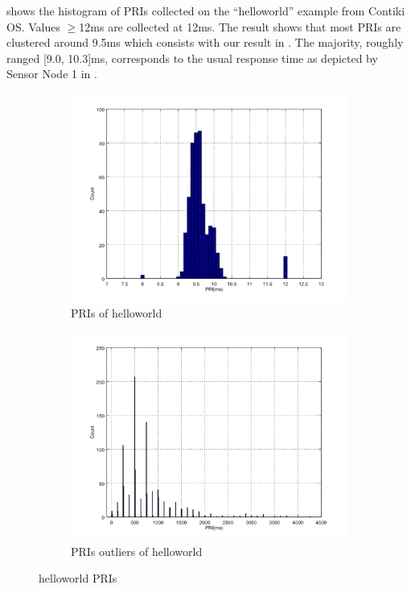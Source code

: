 
 shows the histogram of PRIs collected on the ``helloworld'' example from Contiki OS. Values $\geq$12ms are collected at 12ms. The result shows that most PRIs are clustered around 9.5ms which consists with our result in . The majority, roughly ranged [9.0, 10.3]ms, corresponds to the usual response time as depicted by Sensor Node 1 in . 

\begin{figure}[!h]
	\centering
	\begin{subfigure}{0.45\textwidth}
		\includegraphics[width=\textwidth]{fig/helloworld_cc2538.png}
		\caption{PRIs of helloworld\label{HelloworldPriNormal}}
	\end{subfigure}
	\begin{subfigure}{0.45\textwidth}
		\includegraphics[width=\textwidth]{fig/helloworld_cc2538_outlier.png}
		\caption{PRIs outliers of helloworld\label{HelloworldPriOutliers}}
	\end{subfigure}
	\caption{helloworld PRIs\label{HelloworldPri}}
\end{figure}

